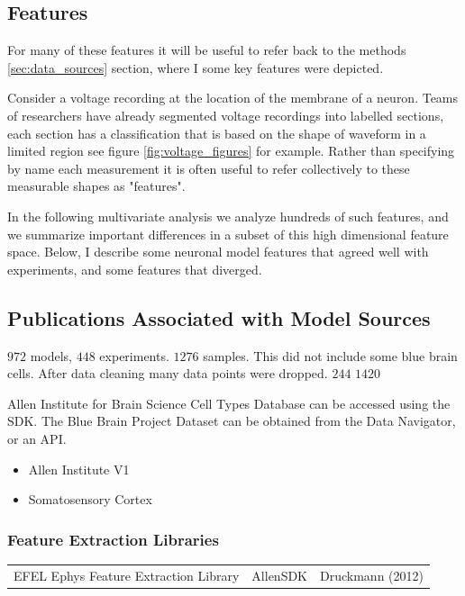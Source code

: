 \subsection{Features} 

For many of these features it will be useful to refer back to the methods \ref{sec:data_sources} section, where I some key features were depicted. 

Consider a voltage recording at the location of the membrane of a neuron. Teams of researchers have already segmented voltage recordings into labelled sections, each section has a classification that is based on the shape of waveform in a limited region see figure \ref{fig:voltage_figures} for example. Rather than specifying by name each measurement it is often useful to refer collectively to these measurable shapes as "features". 

In the following multivariate analysis we analyze hundreds of such features, and we summarize important differences in a subset of this high dimensional feature space.  Below, I describe some neuronal model features that agreed well with experiments, and some features that diverged.


\subsection{Publications Associated with Model Sources}
$972$ models, $448$ experiments.
$1276$ samples. This did not include some blue brain cells. After data cleaning many data points were dropped.  $244$
$1420$


Allen Institute for Brain Science Cell Types Database \citep{celltypes} can be accessed using the SDK.
The Blue Brain Project Dataset \citep{toledo} can be obtained from the Data Navigator, or an API.

\begin{itemize}
\item Allen Institute V1 \cite{gouwens2018systematic}
\item Somatosensory Cortex \cite{markram2006blue} 
\end{itemize}

\subsubsection{Feature Extraction Libraries}
\begin{table}
\centering
\begin{tabular}{lll}
{} EFEL Ephys Feature Extraction Library & AllenSDK & Druckmann (2012) 
\end{tabular}
\end{table}




